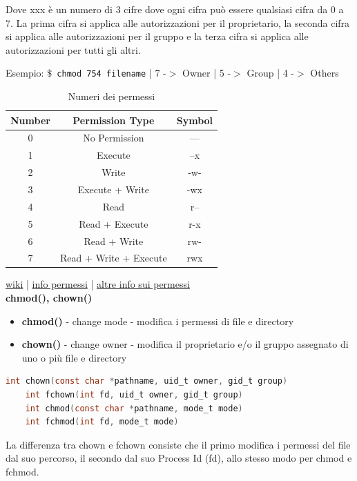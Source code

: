 Dove xxx è un numero di 3 cifre dove ogni cifra può essere qualsiasi cifra da 0 a 7. La prima cifra si applica alle autorizzazioni per il proprietario, la seconda cifra si applica alle autorizzazioni per il gruppo e la terza cifra si applica alle autorizzazioni per tutti gli altri.

Esempio:
\texttt{$\$$ chmod 754 filename} |
7 -$>$ Owner | 5 -$>$ Group | 4 -$>$ Others

\begin{table}[ht]
    \centering
    \begin{tabular}{c|c|c}\textbf{}
     \textbf{Number} &\textbf{ Permission Type } & \textbf{Symbol} \\
     \hline
     0 & No Permission & --- \\
    1 &	Execute & --x \\
    2 &	Write &	-w-\\
    3 &	Execute + Write & -wx\\
    4 &	Read & r--\\
    5 &	Read + Execute & r-x\\
    6 &	Read + Write & rw-\\
    7 &	Read + Write + Execute & rwx\\
    
    
\end{tabular}
    \caption{Numeri dei permessi}
    \label{tab:permessi}
\end{table}





\href{https://wiki.archlinux.org/title/File_permissions_and_attributes}{wiki} |
\href{https://www.guru99.com/file-permissions.html}{info permessi} |
\href{https://www.linux.com/training-tutorials/understanding-linux-file-permissions/}{altre info sui permessi}\\\newline
\textbf{chmod(), chown()}
\begin{itemize}
    \item \textbf{chmod()} - change mode - modifica i permessi di file e directory
    \item \textbf{chown()} - change owner - modifica il proprietario e/o il gruppo assegnato di uno o più file e directory
\end{itemize}

\begin{lstlisting}[language=C]
    int chown(const char *pathname, uid_t owner, gid_t group)
    int fchown(int fd, uid_t owner, gid_t group)
    int chmod(const char *pathname, mode_t mode)
    int fchmod(int fd, mode_t mode)
\end{lstlisting}
La differenza tra chown e fchown consiste che il primo modifica i permessi del file dal suo percorso, il secondo dal suo Process Id (fd), allo stesso modo per chmod e fchmod.

